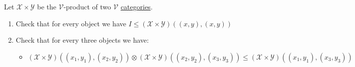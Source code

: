 Let $\mathcal{X} \times \mathcal{Y}$ be the $\mathcal{V}$-product of two $\mathcal{V}$ \hyperref[D2.46]{categories}.
    \begin{enumerate}
      \item Check that for every object we have $I \leq (\mathcal{X} \times \mathcal{Y})((x,y),(x,y))$
      \item Check that for every three objects we have:
            \begin{itemize}
              \item $(\mathcal{X} \times \mathcal{Y})((x_1,y_1),(x_2,y_2)) \otimes (\mathcal{X} \times \mathcal{Y})((x_2,y_2),(x_3,y_3)) \leq (\mathcal{X} \times \mathcal{Y})((x_1,y_1),(x_3,y_3))$
            \end{itemize}
    \end{enumerate}